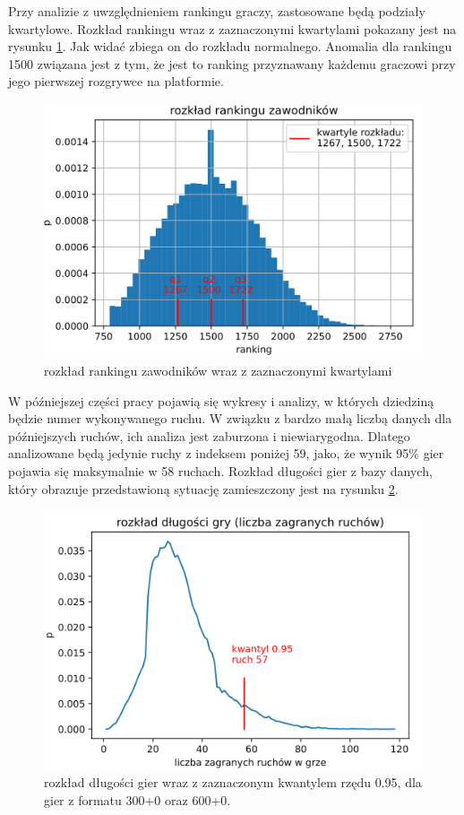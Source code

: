 \documentclass[inzynierska]{pwr_wmat_praca_dyplomowa}
\theoremstyle{plain}
\numberwithin{theorem}{chapter}
\theoremstyle{definition}
\numberwithin{theorem}{chapter}
\begin{document}
Przy analizie z uwzględnieniem rankingu graczy, zastosowane będą podziały kwartylowe. Rozkład rankingu wraz z zaznaczonymi kwartylami pokazany jest na rysunku \ref{rys:rozklad_elo}. Jak widać zbiega on do rozkładu normalnego. Anomalia dla rankingu 1500 związana jest z tym, że jest to ranking przyznawany każdemu graczowi przy jego pierwszej rozgrywce na platformie.
\begin{figure}[H]
	\centering
	\includegraphics[width=\textwidth]{ranking.png}
	\caption{rozkład rankingu zawodników wraz z zaznaczonymi kwartylami}
	\label{rys:rozklad_elo}
\end{figure}
W późniejszej części pracy pojawią się wykresy i analizy, w których dziedziną będzie numer wykonywanego ruchu. W związku z bardzo małą liczbą danych dla późniejszych ruchów, ich analiza jest zaburzona i niewiarygodna. Dlatego analizowane będą jedynie ruchy z indeksem poniżej 59, jako, że wynik 95\% gier pojawia się maksymalnie w 58 ruchach. Rozkład długości gier z bazy danych, który obrazuje przedstawioną sytuację zamieszczony jest na rysunku \ref{rys:dlugosc_gier}.

\begin{figure}[h]
	\centering
	\includegraphics[width=\textwidth]{dlugosc_gry.png}
	\caption{rozkład długości gier wraz z zaznaczonym kwantylem rzędu 0.95,  dla gier z formatu 300+0 oraz 600+0.}
	\label{rys:dlugosc_gier}
\end{figure}
\end{document}
